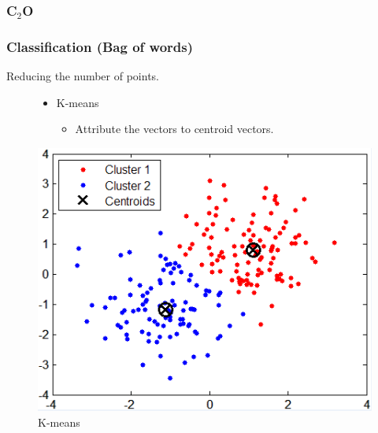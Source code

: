 \documentclass[xcolor=table]{beamer}
\begin{document}
\begin{frame} \frametitle{C$_2$O}

\end{frame}

\begin{frame} \frametitle{Classification (Bag of words)}
Reducing the number of points.

\begin{figure}[htbp]
    \begin{minipage}[c]{.55\linewidth}
      \begin{center}
        \begin{itemize}
            \item K-means
            \begin{itemize}
                \item Attribute the vectors to centroid vectors.
            \end{itemize}
        \end{itemize}
      \end{center}
    \end{minipage}
    \hfill
    \begin{minipage}[c]{.40\linewidth}
      \begin{center}
    \includegraphics[scale=0.20]{kmeans.png}
    \caption{K-means}
    \label{fig:kmeans}
      \end{center}
    \end{minipage}
\end{figure}


\end{frame}
\end{document}

